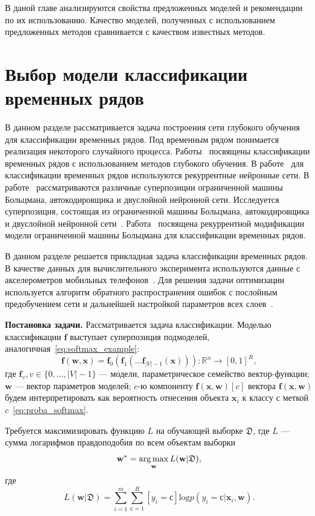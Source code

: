 В даной главе анализируются свойства предложенных моделей и рекомендации по их использованию. Качество моделей, полученных с использованием предложенных методов сравнивается с качеством
известных методов.
\section{Выбор модели классификации временных рядов}

В данном разделе рассматривается задача построения сети глубокого обучения для классификации временных рядов. Под временным рядом понимается реализация некоторого случайного процесса.  Работы~\cite{ts1,ts2,ts3} посвящены классификации временных рядов с использованием методов глубокого обучения. В работе~\cite{ts2}  для классификации временных рядов  используются рекуррентные нейронные сети. В работе~\cite{ts3} рассматриваются различные суперпозиции ограниченной машины Больцмана, автокодировщика и двуслойной нейронной сети. Исследуется суперпозиция, состоящая из ограниченной машины Больцмана, автокодировщика и двуслойной нейронной сети~\cite{founds}. Работа~\cite{recrbm} посвящена рекуррентной модификации модели ограниченной машины Больцмана для классификации временных рядов. 

В данном разделе решается прикладная задача классификации временных рядов. В качестве данных для вычислительного эксперимента используются данные с акселерометров мобильных телефонов~\cite{wisdm}. Для решения задачи оптимизации используется алгоритм обратного распространения ошибок с послойным предобучением сети и дальнейшей настройкой параметров всех слоев~\cite{finetuning}.

\textbf{Постановка задачи. }
Рассматривается задача классификации. 
Моделью классификации  $\mathbf{f}$ выступает суперпозиция подмоделей, аналогичная~\eqref{eq:softmax_example}:
\begin{equation}
\label{eq:wisdm_superposition}
 \mathbf{f}(\mathbf{w}, \mathbf{x}) = \mathbf{f}_0(\mathbf{f}_1(\dots \mathbf{f}_{|V|-1}(\mathbf{x}))): \mathbb{R}^n \to [0,1]^R,
\end{equation}
где $\mathbf{f}_v, v \in \{0,\dots,{|V|-1}\}$ --- модели, параметрическое семейство вектор-функции; $\mathbf{w}$ --- вектор параметров моделей;
$c$-ю компоненту $\mathbf{f}(\mathbf{x}, \mathbf{w})[c]$ вектора $\mathbf{f}(\mathbf{x},\mathbf{w})$ будем интерпретировать как вероятность отнесения объекта $\mathbf{x}_i$ к классу с меткой $c$~\eqref{eq:proba_softmax}.

Требуется максимизировать функцию $L$ на обучающей выборке $\mathfrak{D}$,
где $L$ --- сумма логарифмов правдоподобия по всем объектам выборки
\[
\mathbf{w}^{*} = \operatorname*{arg\,max}_\mathbf{w} L(\mathbf{w}|\mathfrak{D}),
\]
где
\[
 L(\mathbf{w}|\mathfrak{D}) = \sum_{i=1}^m \sum_{с=1}^R [y_i = с] \text{log} p(y_i=с|\mathbf{x}_i,\mathbf{w}).
\]

